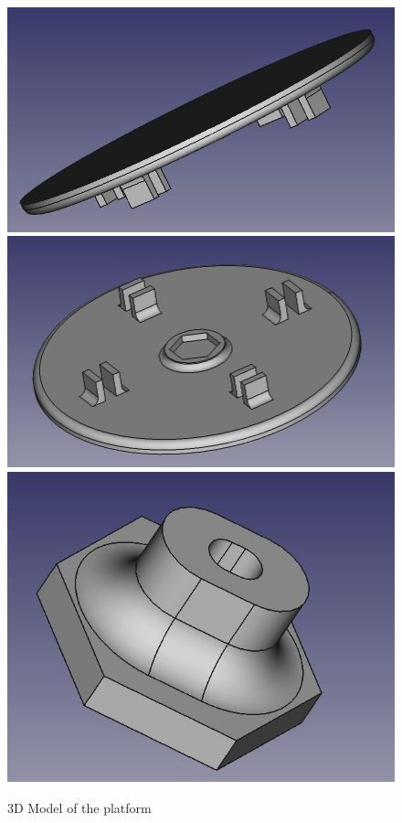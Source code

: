 \documentclass[12pt]{report}
\begin{document}
\begin{figure}[h]
\includegraphics[scale=0.3]{platform_top.jpg}
\includegraphics[scale=0.25]{platform_bottom.jpg}
\includegraphics[scale=0.3]{connector.jpg}
\caption{3D Model of the platform}
\end{figure}
\end{document}
